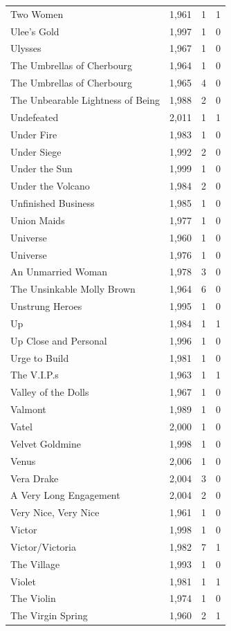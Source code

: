 \begin{tabular}{lrrr}
Two Women & 1,961 & 1 & 1 \\
Ulee's Gold & 1,997 & 1 & 0 \\
Ulysses & 1,967 & 1 & 0 \\
The Umbrellas of Cherbourg & 1,964 & 1 & 0 \\
The Umbrellas of Cherbourg & 1,965 & 4 & 0 \\
The Unbearable Lightness of Being & 1,988 & 2 & 0 \\
Undefeated & 2,011 & 1 & 1 \\
Under Fire & 1,983 & 1 & 0 \\
Under Siege & 1,992 & 2 & 0 \\
Under the Sun & 1,999 & 1 & 0 \\
Under the Volcano & 1,984 & 2 & 0 \\
Unfinished Business & 1,985 & 1 & 0 \\
Union Maids & 1,977 & 1 & 0 \\
Universe & 1,960 & 1 & 0 \\
Universe & 1,976 & 1 & 0 \\
An Unmarried Woman & 1,978 & 3 & 0 \\
The Unsinkable Molly Brown & 1,964 & 6 & 0 \\
Unstrung Heroes & 1,995 & 1 & 0 \\
Up & 1,984 & 1 & 1 \\
Up Close and Personal & 1,996 & 1 & 0 \\
Urge to Build & 1,981 & 1 & 0 \\
The V.I.P.s & 1,963 & 1 & 1 \\
Valley of the Dolls & 1,967 & 1 & 0 \\
Valmont & 1,989 & 1 & 0 \\
Vatel & 2,000 & 1 & 0 \\
Velvet Goldmine & 1,998 & 1 & 0 \\
Venus & 2,006 & 1 & 0 \\
Vera Drake & 2,004 & 3 & 0 \\
A Very Long Engagement & 2,004 & 2 & 0 \\
Very Nice, Very Nice & 1,961 & 1 & 0 \\
Victor & 1,998 & 1 & 0 \\
Victor/Victoria & 1,982 & 7 & 1 \\
The Village & 1,993 & 1 & 0 \\
Violet & 1,981 & 1 & 1 \\
The Violin & 1,974 & 1 & 0 \\
The Virgin Spring & 1,960 & 2 & 1 \\

\end{tabular}
